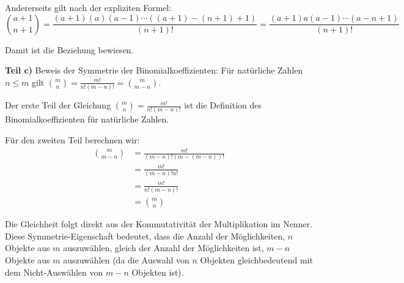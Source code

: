 \documentclass{article}
\begin{document}
Andererseits gilt nach der expliziten Formel:
$$\binom{a+1}{n+1} = \frac{(a+1)(a)(a-1)\cdots((a+1)-(n+1)+1)}{(n+1)!} = \frac{(a+1)a(a-1)\cdots(a-n+1)}{(n+1)!}$$

Damit ist die Beziehung bewiesen.

\textbf{Teil c)} Beweis der Symmetrie der Binomialkoeffizienten: Für natürliche Zahlen $n \leq m$ gilt $\binom{m}{n} = \frac{m!}{n!(m-n)!} = \binom{m}{m-n}$.

Der erste Teil der Gleichung $\binom{m}{n} = \frac{m!}{n!(m-n)!}$ ist die Definition des Binomialkoeffizienten für natürliche Zahlen.

Für den zweiten Teil berechnen wir:
\begin{align}
\binom{m}{m-n} &= \frac{m!}{(m-n)!(m-(m-n))!} \\
&= \frac{m!}{(m-n)!n!} \\
&= \frac{m!}{n!(m-n)!} \\
&= \binom{m}{n}
\end{align}

Die Gleichheit folgt direkt aus der Kommutativität der Multiplikation im Nenner. Diese Symmetrie-Eigenschaft bedeutet, dass die Anzahl der Möglichkeiten, $n$ Objekte aus $m$ auszuwählen, gleich der Anzahl der Möglichkeiten ist, $m-n$ Objekte aus $m$ auszuwählen (da die Auswahl von $n$ Objekten gleichbedeutend mit dem Nicht-Auswählen von $m-n$ Objekten ist).
\end{document}
